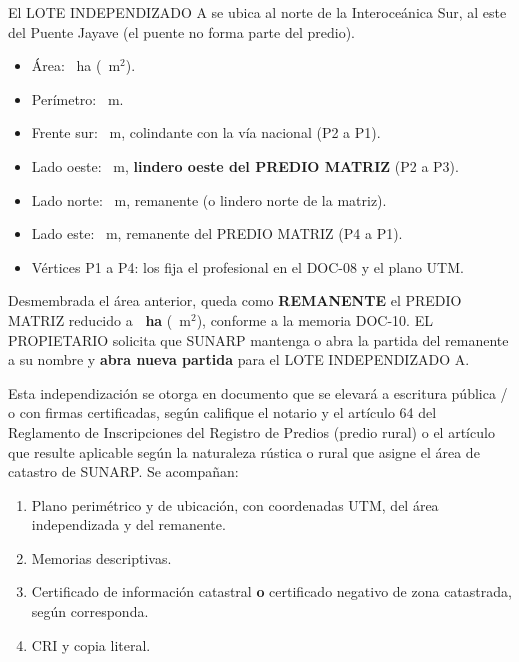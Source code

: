 \documentclass[12pt,a4paper]{article}
\begin{document}
El LOTE INDEPENDIZADO A se ubica al norte de la Interoceánica Sur, al este del Puente Jayave (el puente no forma parte del predio). \CriterioRecorte

\begin{itemize}[leftmargin=1.15cm]
\item Área: \AreaIndependizarHa\ ha (\AreaIndependizarMetros\ m$^2$).
\item Perímetro: \PerimetroM\ m.
\item Frente sur: \FrenteM\ m, colindante con la vía nacional (P2 a P1).
\item Lado oeste: \FondoM\ m, \textbf{lindero oeste del PREDIO MATRIZ} (P2 a P3).
\item Lado norte: \FrenteM\ m, remanente (o lindero norte de la matriz).
\item Lado este: \FondoM\ m, remanente del PREDIO MATRIZ (P4 a P1).
\item Vértices P1 a P4: los fija el profesional en el DOC-08 y el plano UTM.
\end{itemize}

Desmembrada el área anterior, queda como \textbf{REMANENTE} el PREDIO MATRIZ reducido a \textbf{\AreaRemanenteHa\ ha} (\AreaRemanenteMetros\ m$^2$), conforme a la memoria DOC-10. EL PROPIETARIO solicita que SUNARP mantenga o abra la partida del remanente a su nombre y \textbf{abra nueva partida} para el LOTE INDEPENDIZADO A.

Esta independización se otorga en documento que se elevará a escritura pública / o con firmas certificadas, según califique el notario y el artículo 64 del Reglamento de Inscripciones del Registro de Predios (predio rural) o el artículo que resulte aplicable según la naturaleza rústica o rural que asigne el área de catastro de SUNARP. Se acompañan:

\begin{enumerate}[leftmargin=1.15cm]
\item Plano perimétrico y de ubicación, con coordenadas UTM, del área independizada y del remanente.
\item Memorias descriptivas.
\item Certificado de información catastral \textbf{o} certificado negativo de zona catastrada, según corresponda.
\item CRI y copia literal.
\end{enumerate}
\end{document}
